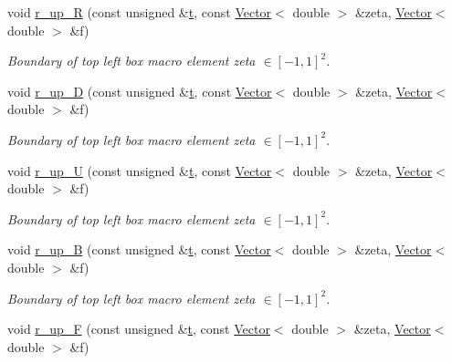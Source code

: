 \begin{DoxyCompactItemize}
void \hyperlink{classoomph_1_1EighthSphereDomain_ad38d27ad06d83c94c768fbda98c939e7}{r\+\_\+up\+\_\+R} (const unsigned \&\hyperlink{cfortran_8h_af6f0bd3dc13317f895c91323c25c2b8f}{t}, const \hyperlink{classoomph_1_1Vector}{Vector}$<$ double $>$ \&zeta, \hyperlink{classoomph_1_1Vector}{Vector}$<$ double $>$ \&f)
\begin{DoxyCompactList}\small\item\em Boundary of top left box macro element zeta $ \in [-1,1]^2 $. \end{DoxyCompactList}\item 
void \hyperlink{classoomph_1_1EighthSphereDomain_ad55bde69a74b24f1c9c6cc6bb277e39b}{r\+\_\+up\+\_\+D} (const unsigned \&\hyperlink{cfortran_8h_af6f0bd3dc13317f895c91323c25c2b8f}{t}, const \hyperlink{classoomph_1_1Vector}{Vector}$<$ double $>$ \&zeta, \hyperlink{classoomph_1_1Vector}{Vector}$<$ double $>$ \&f)
\begin{DoxyCompactList}\small\item\em Boundary of top left box macro element zeta $ \in [-1,1]^2 $. \end{DoxyCompactList}\item 
void \hyperlink{classoomph_1_1EighthSphereDomain_a303c406fe673675f497522dae69f849c}{r\+\_\+up\+\_\+U} (const unsigned \&\hyperlink{cfortran_8h_af6f0bd3dc13317f895c91323c25c2b8f}{t}, const \hyperlink{classoomph_1_1Vector}{Vector}$<$ double $>$ \&zeta, \hyperlink{classoomph_1_1Vector}{Vector}$<$ double $>$ \&f)
\begin{DoxyCompactList}\small\item\em Boundary of top left box macro element zeta $ \in [-1,1]^2 $. \end{DoxyCompactList}\item 
void \hyperlink{classoomph_1_1EighthSphereDomain_aaac560ab6bbe35010c1ff61a466d1252}{r\+\_\+up\+\_\+B} (const unsigned \&\hyperlink{cfortran_8h_af6f0bd3dc13317f895c91323c25c2b8f}{t}, const \hyperlink{classoomph_1_1Vector}{Vector}$<$ double $>$ \&zeta, \hyperlink{classoomph_1_1Vector}{Vector}$<$ double $>$ \&f)
\begin{DoxyCompactList}\small\item\em Boundary of top left box macro element zeta $ \in [-1,1]^2 $. \end{DoxyCompactList}\item 
void \hyperlink{classoomph_1_1EighthSphereDomain_a9e419235f4800eab872523bdbfe72fb6}{r\+\_\+up\+\_\+F} (const unsigned \&\hyperlink{cfortran_8h_af6f0bd3dc13317f895c91323c25c2b8f}{t}, const \hyperlink{classoomph_1_1Vector}{Vector}$<$ double $>$ \&zeta, \hyperlink{classoomph_1_1Vector}{Vector}$<$ double $>$ \&f)

\end{DoxyCompactItemize}
